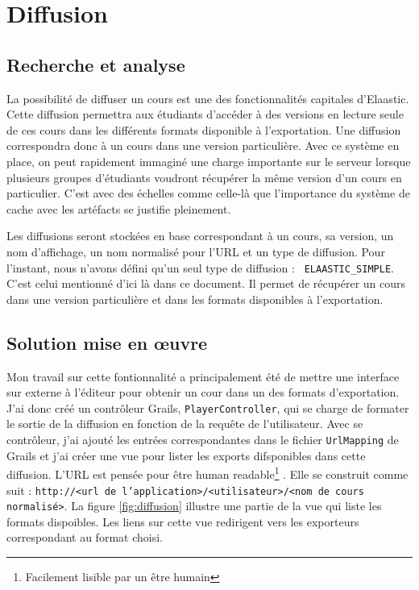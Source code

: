 \section{Diffusion}
\subsection{Recherche et analyse}
La possibilité de diffuser un cours est une des fonctionnalités capitales
d'Elaastic. Cette diffusion permettra aux étudiants d'accéder à des versions en
\og lecture seule \fg{} de ces cours dans les différents formats disponible à
l'exportation. Une diffusion correspondra donc à un cours dans une version
particulière. Avec ce système en place, on peut rapidement immaginé une charge
importante sur le serveur lorsque plusieurs groupes d'étudiants voudront
récupérer la même version d'un cours en particulier. C'est avec des échelles
comme celle-là que l'importance du système de cache avec les artéfacts se
justifie pleinement.

Les diffusions seront stockées en base correspondant à un cours, sa version, un
nom d'affichage, un nom normalisé pour l'URL et un type de diffusion. Pour
l'instant, nous n'avons défini qu'un seul type de diffusion : {\tt
ELAASTIC\_SIMPLE}. C'est celui mentionné d'ici là dans ce document. Il permet de
récupérer un cours dans une version particulière et dans les formats disponibles
à l'exportation.

\subsection{Solution mise en \oe uvre}
Mon travail sur cette fontionnalité a principalement été de mettre une interface
sur \og externe \fg{} à l'éditeur pour obtenir un cour dans un des formats
d'exportation. J'ai donc créé un contrôleur Grails, {\tt PlayerController}, qui
se charge de formater le sortie de la diffusion en fonction de la requête de
l'utilisateur. Avec se contrôleur, j'ai ajouté les entrées correspondantes dans
le fichier {\tt UrlMapping} de Grails et j'ai créer une vue pour lister les
exports difsponibles dans cette diffusion. L'URL est pensée pour être \og human
readable\footnote{Facilement lisible par un être humain} \fg{}. Elle se
construit comme suit : {\tt http://<url de l'application>/<utilisateur>/<nom de cours
normalisé>}. La figure \ref{fig:diffusion} illustre une partie de la vue qui
liste les formats dispoibles. Les liens sur cette vue redirigent vers les
exporteurs correspondant au format choisi.

